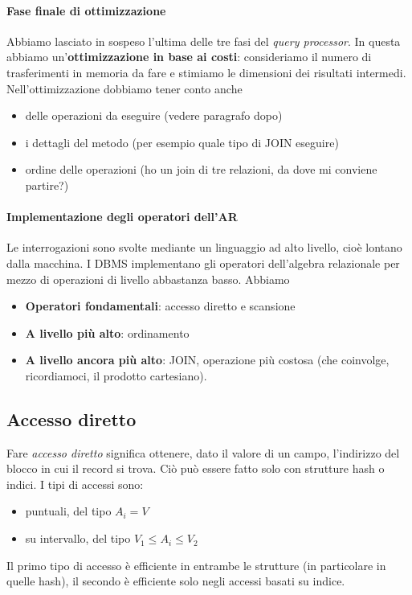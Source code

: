 \paragraph{Fase finale di ottimizzazione} Abbiamo lasciato in sospeso l'ultima delle tre fasi del \emph{query processor}. In questa abbiamo un'\textbf{ottimizzazione in base ai costi}: consideriamo il numero di trasferimenti in memoria da fare e stimiamo le dimensioni dei risultati intermedi. Nell'ottimizzazione dobbiamo tener conto anche
\begin{itemize}
	\item delle operazioni da eseguire (vedere paragrafo dopo)
	\item i dettagli del metodo (per esempio quale tipo di JOIN eseguire)
	\item ordine delle operazioni (ho un join di tre relazioni, da dove mi conviene partire?)
\end{itemize}
\paragraph{Implementazione degli operatori dell'AR} Le interrogazioni sono svolte mediante un linguaggio ad alto livello, cioè lontano dalla macchina. I DBMS implementano gli operatori dell'algebra relazionale per mezzo di operazioni di livello abbastanza basso. Abbiamo
\begin{itemize}
	\item \textbf{Operatori fondamentali}: accesso diretto e scansione
	\item \textbf{A livello più alto}: ordinamento
	\item \textbf{A livello ancora più alto}: JOIN, operazione più costosa (che coinvolge, ricordiamoci, il prodotto cartesiano).
\end{itemize}
\subsection{Accesso diretto}
Fare \emph{accesso diretto} significa ottenere, dato il valore di un campo, l'indirizzo del blocco in cui il record si trova. Ciò può essere fatto solo con strutture hash o indici. I tipi di accessi sono:
\begin{itemize}
	\item puntuali, del tipo $A_i=V$
	\item su intervallo, del tipo $V_1 \leq A_i \leq V_2$
\end{itemize}
Il primo tipo di accesso è efficiente in entrambe le strutture (in particolare in quelle hash), il secondo è efficiente solo negli accessi basati su indice. 
